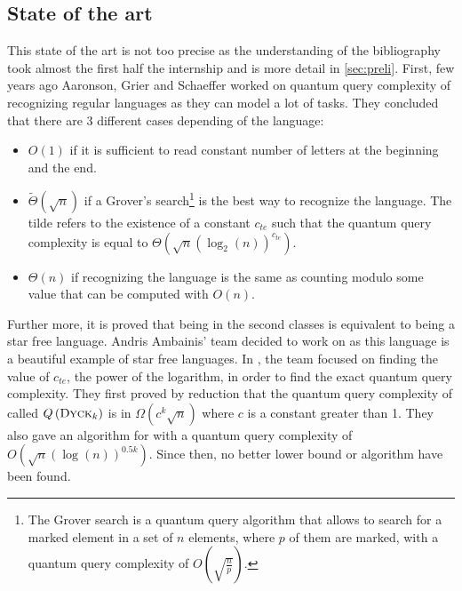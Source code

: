 \subsection{State of the art}
This state of the art is not too precise as the understanding of the
bibliography took almost the first half the internship and is
more detail in \autoref{sec:preli}. First, few years ago Aaronson,
Grier and Schaeffer \cite[2019]{trichotomy_not_andris} worked on quantum query complexity
of recognizing regular languages as they can model a lot of tasks. They
concluded that there are 3 different cases depending of the language:
\begin{itemize}
    \item $O(1)$ if it is sufficient to read constant number of letters at the beginning and the end.
    \item $\tilde{\Theta}(\sqrt{n})$ if a Grover's search\footnote{
              The Grover search is a quantum query algorithm that allows to
              search for a marked element in a set of $n$ elements, where $p$ of them are marked,
              with a quantum query complexity of $O(\sqrt{\frac{n}{p}})$.
          } is the best way to recognize the language. The tilde refers to the existence of a
          constant $c_{te}$ such that the quantum query complexity is
          equal to $\Theta \left(\sqrt{n}(\log_2(n))^{c_{te}}\right)$.
    \item $\Theta(n)$ if recognizing the language is the same as counting modulo some value that can
          be computed with $O(n)$.
\end{itemize}
Further more, it is proved that being in the second classes is equivalent to
being a star free language. Andris Ambainis' team decided to work on  as this
language is a beautiful example of star free languages. In \cite[2020]{art:2DGrid},
the team focused on finding the value of $c_{te}$, the power of the logarithm, in order
to find the exact quantum query complexity.
They first proved by reduction that the quantum query complexity of 
called $Q\left(\textsc{Dyck$_{k}$}\right)$ is in $\Omega\left(c^k\sqrt{n}\right)$ where $c$ is
a constant greater than 1. They also gave an algorithm for  with a quantum
query complexity of $O\left(\sqrt{n}(\log(n))^{0.5k}\right)$. Since then, no better
lower bound or algorithm have been found.

